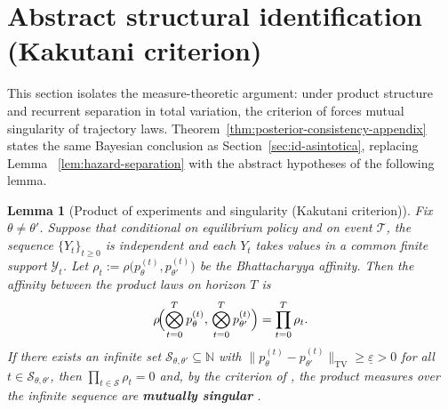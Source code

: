 \documentclass[ecta,nameyear,final,supplement]{econsocart}
\numberwithin{equation}{section}
\numberwithin{table}{section}
\newtheorem{lemma}[theorem]{Lemma}
\theoremstyle{definition}
\begin{document}
\section{Abstract structural identification (Kakutani criterion)}
\label{sec:id-abstracta}

\noindent This section isolates the measure-theoretic argument: under product
structure and recurrent separation in total variation, the criterion of
\citet{Kakutani1948} forces mutual singularity of trajectory laws.
Theorem~\ref{thm:posterior-consistency-appendix} states the same Bayesian
conclusion as Section~\ref{sec:id-asintotica}, replacing Lemma
~\ref{lem:hazard-separation} with the abstract hypotheses of the following
lemma.


\begin{lemma}[Product of experiments and singularity (Kakutani criterion)]
\label{lem:general-id-appendix}
Fix $\theta\neq\theta'$. Suppose that conditional on equilibrium policy and
on event $\mathcal{T}$, the sequence $\{Y_t\}_{t\ge 0}$ is independent and each
$Y_t$ takes values in a common finite support $\mathcal{Y}_t$. Let
$\rho_t:=\rho\bigl(p_\theta^{(t)},p_{\theta'}^{(t)}\bigr)$ be the
Bhattacharyya affinity. Then the affinity between the product laws on horizon
$T$ is
\begin{equation}
\label{eq:appendix-rho-product}
\rho\!\Bigl(\bigotimes_{t=0}^{T}p_\theta^{(t)},\,
            \bigotimes_{t=0}^{T}p_{\theta'}^{(t)}\Bigr)
=\prod_{t=0}^{T}\rho_t.
\end{equation}
If there exists an infinite set $\mathcal{S}_{\theta,\theta'}\subseteq\mathbb{N}$
with $\|p_\theta^{(t)}-p_{\theta'}^{(t)}\|_{\mathrm{TV}}\ge\underline\varepsilon>0$
for all $t\in\mathcal{S}_{\theta,\theta'}$, then
$\prod_{t\in\mathcal{S}}\rho_t=0$ and, by the criterion of
\citet{Kakutani1948}, the product measures over the infinite sequence are
\textbf{mutually singular} \citep{Shiryaev2019Probability}.
\end{lemma}
\end{document}
